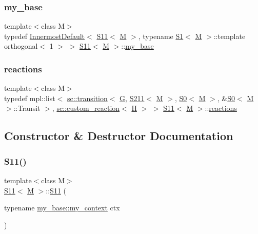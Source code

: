 \subsubsection{\texorpdfstring{my\+\_\+base}{my\_base}}
{\footnotesize\ttfamily template$<$class M$>$ \\
typedef \mbox{\hyperlink{struct_innermost_default}{Innermost\+Default}}$<$ \mbox{\hyperlink{struct_s11}{S11}}$<$ \mbox{\hyperlink{struct_m}{M}} $>$, typename \mbox{\hyperlink{struct_s1}{S1}}$<$ \mbox{\hyperlink{struct_m}{M}} $>$\+::template orthogonal$<$ 1 $>$ $>$ \mbox{\hyperlink{struct_s11}{S11}}$<$ \mbox{\hyperlink{struct_m}{M}} $>$\+::\mbox{\hyperlink{struct_s11_accc75cca39b9a2b76fc048603f4cada2}{my\+\_\+base}}}

\mbox{\label{struct_s11_a3aec2b028d4c92398d4056b861050c36}} 
\subsubsection{\texorpdfstring{reactions}{reactions}}
{\footnotesize\ttfamily template$<$class M$>$ \\
typedef mpl\+::list$<$ \mbox{\hyperlink{classboost_1_1statechart_1_1transition}{sc\+::transition}}$<$ \mbox{\hyperlink{struct_g}{G}}, \mbox{\hyperlink{struct_s211}{S211}}$<$ \mbox{\hyperlink{struct_m}{M}} $>$, \mbox{\hyperlink{struct_s0}{S0}}$<$ \mbox{\hyperlink{struct_m}{M}} $>$, \&\mbox{\hyperlink{struct_s0}{S0}}$<$ \mbox{\hyperlink{struct_m}{M}} $>$\+::Transit $>$, \mbox{\hyperlink{classboost_1_1statechart_1_1custom__reaction}{sc\+::custom\+\_\+reaction}}$<$ \mbox{\hyperlink{struct_h}{H}} $>$ $>$ \mbox{\hyperlink{struct_s11}{S11}}$<$ \mbox{\hyperlink{struct_m}{M}} $>$\+::\mbox{\hyperlink{struct_s11_a3aec2b028d4c92398d4056b861050c36}{reactions}}}



\subsection{Constructor \& Destructor Documentation}
\mbox{\label{struct_s11_a7059a43ad90c94b21586461983706c21}} 
\subsubsection{\texorpdfstring{S11()}{S11()}}
{\footnotesize\ttfamily template$<$class M$>$ \\
\mbox{\hyperlink{struct_s11}{S11}}$<$ \mbox{\hyperlink{struct_m}{M}} $>$\+::\mbox{\hyperlink{struct_s11}{S11}} (\begin{DoxyParamCaption}\item[{typename \mbox{\hyperlink{struct_innermost_default_a0aab337364dec3101e80f293b709d53d}{my\+\_\+base\+::my\+\_\+context}}}]{ctx }\end{DoxyParamCaption})\hspace{0.3cm}{\ttfamily [inline]}}



